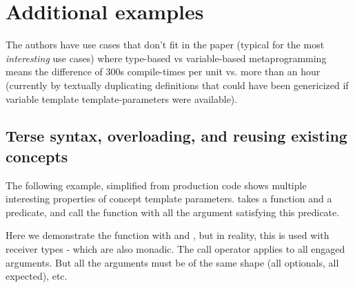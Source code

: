 \documentclass{wg21}
\begin{document}
\section{Additional examples}

The authors have use cases that don't fit in the paper (typical for the most \emph{interesting} use cases) where type-based vs variable-based metaprogramming means the difference of 300s compile-times per unit vs. more than an hour (currently by textually duplicating definitions that could have been genericized if variable template template-parameters were available).

%
%
%
%
%
%
%
%
%
%

\pagebreak

\subsection{Terse syntax, overloading, and reusing existing concepts}

The following example, simplified from production code shows multiple interesting properties of concept template parameters.
 takes a function and a predicate, and call the function with all the argument satisfying this predicate.

Here we demonstrate the function with  and , but in reality, this is used with receiver types - which are also monadic.
The call operator applies  to all engaged arguments. But all the arguments must be of the same shape (all optionals, all expected), etc.
\end{document}

